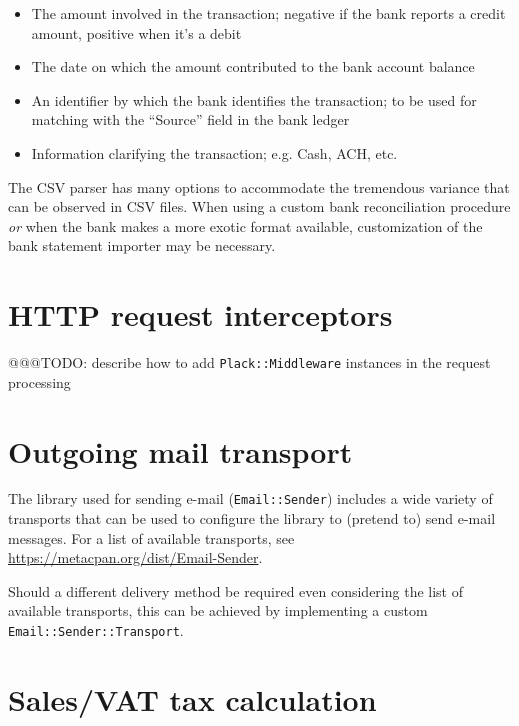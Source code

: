 \begin{itemize}
	\item [amount] The amount involved in the transaction; negative if the bank
		reports a credit amount, positive when it's a debit
	\item [date] The date on which the amount contributed to the bank account balance
	\item [source] An identifier by which the bank identifies the transaction; to be
		used for matching with the ``Source'' field in the bank ledger
	\item [type] Information clarifying the transaction; e.g. Cash, ACH, etc.
\end{itemize}

The CSV parser has many options to accommodate the tremendous variance that can be
observed in CSV files.  When using a custom bank reconciliation procedure \textit{or}
when the bank makes a more exotic format available, customization of the bank statement
importer may be necessary.

\section{HTTP request interceptors}
\label{sec-customization-http-requests}

@@@TODO: describe how to add \texttt{Plack::Middleware} instances in the request processing

\section{Outgoing mail transport}
\label{sec-customization-outgoing-mail}

The library used for sending e-mail (\texttt{Email::Sender})
includes a wide variety of transports that can be used to configure the library to (pretend to) send
e-mail messages.  For a list of available transports, see\\
\url{https://metacpan.org/dist/Email-Sender}.

Should a different delivery method be required even considering the list of available transports,
this can be achieved by implementing a custom\\
\texttt{Email::Sender::Transport}.

\section{Sales/VAT tax calculation}
\label{sec-customization-sales-tax}

